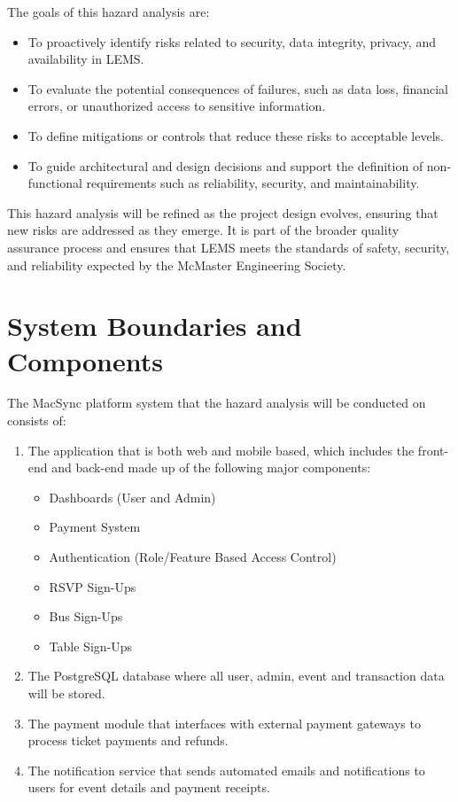 \documentclass{article}
\begin{document}
\par
\vspace{1em}

The goals of this hazard analysis are:
\begin{itemize}
  \item To proactively identify risks related to security, data integrity, privacy, and availability in LEMS.
  \item To evaluate the potential consequences of failures, such as data loss, financial errors, or 
        unauthorized access to sensitive information.
  \item To define mitigations or controls that reduce these risks to acceptable levels.
  \item To guide architectural and design decisions and support the definition of non-functional 
        requirements such as reliability, security, and maintainability.
\end{itemize}

This hazard analysis will be refined as the project design evolves, ensuring that new risks are 
addressed as they emerge. It is part of the broader quality assurance process and ensures that LEMS 
meets the standards of safety, security, and reliability expected by the McMaster Engineering Society.

\section{System Boundaries and Components}

The MacSync platform system that the hazard analysis will be conducted on consists of:
\begin{enumerate}
    \item The application that is both web and mobile based, which includes the front-end and back-end made up of the following major components:
    \begin{itemize}
        \item Dashboards (User and Admin)
        \item Payment System
        \item Authentication (Role/Feature Based Access Control)
        \item RSVP Sign-Ups
        \item Bus Sign-Ups
        \item Table Sign-Ups
    \end{itemize}
    \item The PostgreSQL database where all user, admin, event and transaction data will be stored.
    \item The payment module that interfaces with external payment gateways to process ticket payments and refunds.
    \item The notification service that sends automated emails and notifications to users for event details and payment receipts.
\end{enumerate}
\end{document}
